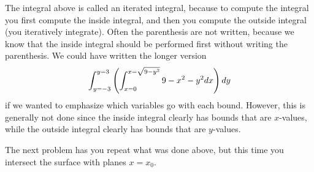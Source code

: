 The integral above is called an iterated integral, because to compute the integral you first compute the inside integral, and then you compute the outside integral (you iteratively integrate). Often the parenthesis are not written, because we know that the inside integral should be performed first without writing the parenthesis. We could have written the longer version $$\displaystyle\int_{y=-3}^{y=3} \left(\int_{x=0}^{x=\sqrt{9-y^2}}9-x^2-y^2 dx\right) dy$$ if we wanted to emphasize which variables go with each bound.  However, this is generally not done since the inside integral clearly has bounds that are $x$-values, while  the outside integral clearly has bounds that are $y$-values.  

The next problem has you repeat what was done above, but this time you intersect the surface with planes $x=x_0$. 

